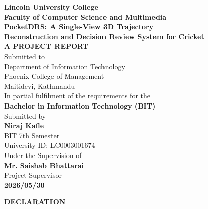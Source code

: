 \documentclass[12pt,a4paper]{report}
\begin{document}
\hypersetup{pageanchor=false}

\begin{titlepage}
\begin{center}

\textbf{\fontsize{14}{17}\selectfont Lincoln University College}\\[4pt]
\textbf{\fontsize{12}{15}\selectfont Faculty of Computer Science and Multimedia}\\[28pt]

\textbf{\fontsize{16}{19}\selectfont PocketDRS: A Single-View 3D Trajectory\\
Reconstruction and Decision Review System for Cricket}\\[24pt]

\textbf{\fontsize{14}{17}\selectfont A PROJECT REPORT}\\[10pt]
\fontsize{12}{15}\selectfont
Submitted to\\[4pt]
Department of Information Technology\\
Phoenix College of Management\\
Maitidevi, Kathmandu\\[20pt]

In partial fulfilment of the requirements for the\\
\textbf{Bachelor in Information Technology (BIT)}\\[24pt]

Submitted by\\[8pt]
\textbf{Niraj Kafle}\\
BIT 7th Semester\\
University ID: LC0003001674\\[18pt]

Under the Supervision of\\[6pt]
\textbf{Mr. Saishab Bhattarai}\\
Project Supervisor\\[24pt]

\vfill
\textbf{2026/05/30}

\end{center}
\end{titlepage}


\begin{center}\textbf{\fontsize{16}{19}\selectfont DECLARATION}\end{center}
\vspace{0.5cm}
\end{document}
